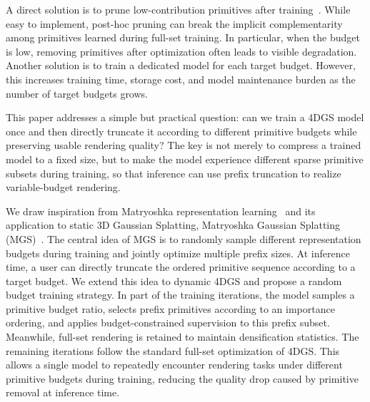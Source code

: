 \documentclass[pdflatex,sn-mathphys]{sn-jnl}
\begin{document}
A direct solution is to prune low-contribution primitives after training~\cite{fan2024lightgaussian,liu2025light4gs}. While easy to implement, post-hoc pruning can break the implicit complementarity among primitives learned during full-set training. In particular, when the budget is low, removing primitives after optimization often leads to visible degradation. Another solution is to train a dedicated model for each target budget. However, this increases training time, storage cost, and model maintenance burden as the number of target budgets grows.

This paper addresses a simple but practical question: can we train a 4DGS model once and then directly truncate it according to different primitive budgets while preserving usable rendering quality? The key is not merely to compress a trained model to a fixed size, but to make the model experience different sparse primitive subsets during training, so that inference can use prefix truncation to realize variable-budget rendering.

We draw inspiration from Matryoshka representation learning~\cite{kusupati2022matryoshka} and its application to static 3D Gaussian Splatting, Matryoshka Gaussian Splatting (MGS)~\cite{guo2026matryoshkagaussiansplatting}. The central idea of MGS is to randomly sample different representation budgets during training and jointly optimize multiple prefix sizes. At inference time, a user can directly truncate the ordered primitive sequence according to a target budget. We extend this idea to dynamic 4DGS and propose a random budget training strategy. In part of the training iterations, the model samples a primitive budget ratio, selects prefix primitives according to an importance ordering, and applies budget-constrained supervision to this prefix subset. Meanwhile, full-set rendering is retained to maintain densification statistics. The remaining iterations follow the standard full-set optimization of 4DGS. This allows a single model to repeatedly encounter rendering tasks under different primitive budgets during training, reducing the quality drop caused by primitive removal at inference time.
\end{document}
